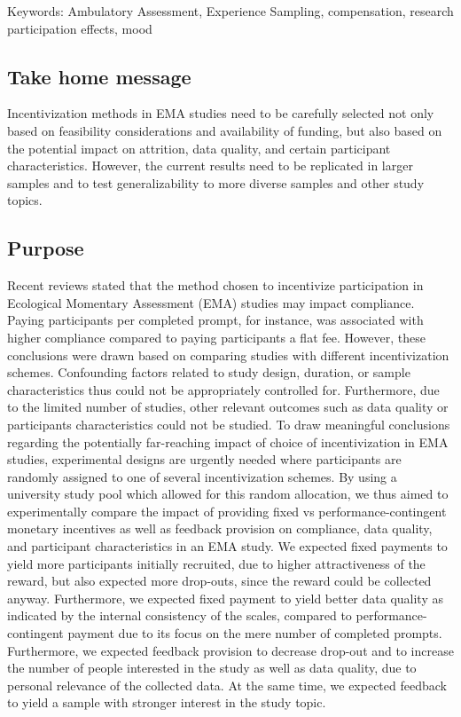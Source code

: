 \documentclass[authordate, empirical]{jote-new-article}
\begin{document}
	Keywords: Ambulatory Assessment, Experience Sampling, compensation, research participation effects, mood







	\subsection{Take home message}



	Incentivization methods in EMA studies need to be carefully selected not only based on feasibility considerations and availability of funding, but also based on the potential impact on attrition, data quality, and certain participant characteristics. However, the current results need to be replicated in larger samples and to test generalizability to more diverse samples and other study topics.







	\subsection{Purpose}



	Recent reviews stated that the method chosen to incentivize participation in Ecological Momentary Assessment (EMA) studies may impact compliance. Paying participants per completed prompt, for instance, was associated with higher compliance compared to paying participants a flat fee. However, these conclusions were drawn based on comparing studies with different incentivization schemes. Confounding factors related to study design, duration, or sample characteristics thus could not be appropriately controlled for. Furthermore, due to the limited number of studies, other relevant outcomes such as data quality or participants characteristics could not be studied. To draw meaningful conclusions regarding the potentially far-reaching impact of choice of incentivization in EMA studies, experimental designs are urgently needed where participants are randomly assigned to one of several incentivization schemes. By using a university study pool which allowed for this random allocation, we thus aimed to experimentally compare the impact of providing fixed vs performance-contingent monetary incentives as well as feedback provision on compliance, data quality, and participant characteristics in an EMA study. We expected fixed payments to yield more participants initially recruited, due to higher attractiveness of the reward, but also expected more drop-outs, since the reward could be collected anyway. Furthermore, we expected fixed payment to yield better data quality as indicated by the internal consistency of the scales, compared to performance-contingent payment due to its focus on the mere number of completed prompts. Furthermore, we expected feedback provision to decrease drop-out and to increase the number of people interested in the study as well as data quality, due to personal relevance of the collected data. At the same time, we expected feedback to yield a sample with stronger interest in the study topic.
\end{document}
